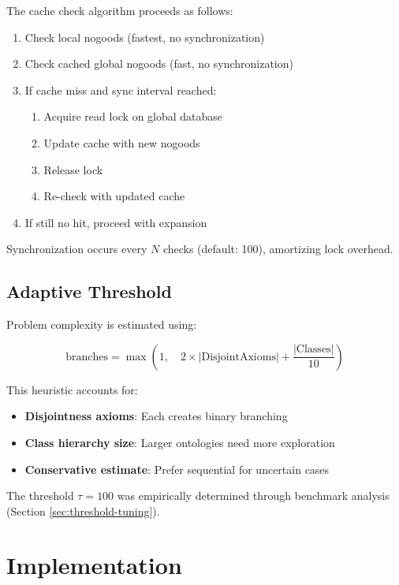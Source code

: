 \documentclass[preprint,12pt]{elsarticle}
\begin{document}
The cache check algorithm proceeds as follows:

\begin{enumerate}
    \item Check local nogoods (fastest, no synchronization)
    \item Check cached global nogoods (fast, no synchronization)
    \item If cache miss and sync interval reached:
    \begin{enumerate}
        \item Acquire read lock on global database
        \item Update cache with new nogoods
        \item Release lock
        \item Re-check with updated cache
    \end{enumerate}
    \item If still no hit, proceed with expansion
\end{enumerate}

Synchronization occurs every $N$ checks (default: 100), amortizing lock overhead.

\subsection{Adaptive Threshold}
\label{sec:adaptive}

Problem complexity is estimated using:

\begin{equation}
\text{branches} = \max\left(1, \quad 2 \times |\text{DisjointAxioms}| + \frac{|\text{Classes}|}{10}\right)
\label{eq:estimate}
\end{equation}

This heuristic accounts for:
\begin{itemize}
    \item \textbf{Disjointness axioms}: Each creates binary branching
    \item \textbf{Class hierarchy size}: Larger ontologies need more exploration
    \item \textbf{Conservative estimate}: Prefer sequential for uncertain cases
\end{itemize}

The threshold $\tau = 100$ was empirically determined through benchmark analysis (Section \ref{sec:threshold-tuning}).

\section{Implementation}
\label{sec:implementation}
\end{document}
